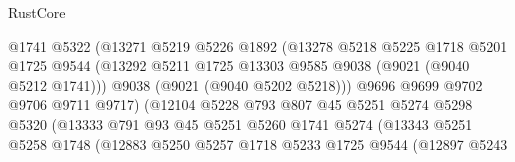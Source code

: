 \begin{lexlean}{RustCore}
\begin{coremodule}
                                  @1741
                                  @5322
                                  (@13271
                                    @5219
                                    @5226
                                    @1892
                                    (@13278
                                      @5218
                                      @5225
                                      @1718
                                      @5201
                                      @1725
                                      @9544
                                      (@13292
                                        @5211
                                        @1725
                                        @13303
                                        @9585
                                        @9038
                                        (@9021 (@9040 @5212 @1741)))
                                      @9038
                                      (@9021 (@9040 @5202 @5218)))
                                    @9696
                                    @9699
                                    @9702
                                    @9706
                                    @9711
                                    @9717)
                                  (@12104
                                    @5228
                                    @793
                                    @807
                                    @45
                                    @5251
                                    @5274
                                    @5298
                                    @5320
                                    (@13333
                                      @791
                                      @93
                                      @45
                                      @5251
                                      @5260
                                      @1741
                                      @5274
                                      (@13343
                                        @5251
                                        @5258
                                        @1748
                                        (@12883
                                          @5250
                                          @5257
                                          @1718
                                          @5233
                                          @1725
                                          @9544
                                          (@12897
                                            @5243

\end{coremodule}
\end{lexlean}
